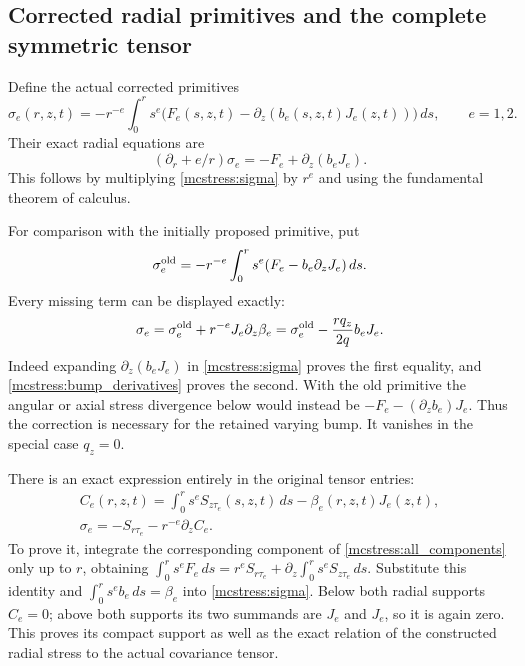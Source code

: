 \documentclass[11pt]{article}
\begin{document}
\subsection{Corrected radial primitives and the complete symmetric tensor}

Define the actual corrected primitives
\begin{equation}\label{mcstress:sigma}
 \sigma_e(r,z,t)=-r^{-e}\int_0^r s^e
       \bigl(F_e(s,z,t)-\partial_z(b_e(s,z,t)J_e(z,t))\bigr)\,ds,
 \qquad e=1,2.
\end{equation}
Their exact radial equations are
\begin{equation}\label{mcstress:sigma_equation}
 (\partial_r+e/r)\sigma_e
      =-F_e+\partial_z(b_eJ_e).
\end{equation}
This follows by multiplying \eqref{mcstress:sigma} by $r^e$ and
using the fundamental theorem of calculus.

For comparison with the initially proposed primitive, put
\[
 \sigma_e^{\rm old}=-r^{-e}\int_0^r s^e
                       (F_e-b_e\partial_zJ_e)\,ds.
\]
Every missing term can be displayed exactly:
\begin{equation}\label{mcstress:primitive_correction}
 \sigma_e=\sigma_e^{\rm old}+r^{-e}J_e\partial_z\beta_e
         =\sigma_e^{\rm old}-\frac{rq_z}{2q}b_eJ_e.
\end{equation}
Indeed expanding $\partial_z(b_eJ_e)$ in
\eqref{mcstress:sigma} proves the first equality, and
\eqref{mcstress:bump_derivatives} proves the second. With the old
primitive the angular or axial stress divergence below would instead
be $-F_e-(\partial_zb_e)J_e$. Thus the correction is necessary for the
retained varying bump. It vanishes in the special case $q_z=0$.

There is an exact expression entirely in the original tensor entries:
\begin{equation}\label{mcstress:compact_flux_correction}
\begin{gathered}
 C_e(r,z,t)=\int_0^r s^eS_{z\tau_e}(s,z,t)\,ds
                                    -\beta_e(r,z,t)J_e(z,t),\\
 \sigma_e=-S_{r\tau_e}-r^{-e}\partial_zC_e.
\end{gathered}
\end{equation}
To prove it, integrate the corresponding component of
\eqref{mcstress:all_components} only up to $r$, obtaining
$\int_0^r s^eF_e\,ds=r^eS_{r\tau_e}
+\partial_z\int_0^r s^eS_{z\tau_e}\,ds$. Substitute this identity
and $\int_0^r s^e b_e\,ds=\beta_e$ into
\eqref{mcstress:sigma}. Below both radial supports $C_e=0$;
above both supports its two summands are $J_e$ and $J_e$, so it is
again zero. This proves its compact support as well as the exact
relation of the constructed radial stress to the actual covariance
tensor.
\end{document}
